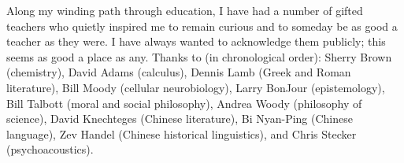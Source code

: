 Along my winding path through education, I have had a number of gifted teachers who quietly inspired me to remain curious and to someday be as good a teacher as they were.  I have always wanted to acknowledge them publicly; this seems as good a place as any.  Thanks to (in chronological order): Sherry Brown (chemistry), David Adams (calculus), Dennis Lamb (Greek and Roman literature), Bill Moody (cellular neurobiology), Larry BonJour (epistemology), Bill Talbott (moral and social philosophy), Andrea Woody (philosophy of science), David Knechteges (Chinese literature), Bi Nyan-Ping (Chinese language), Zev Handel (Chinese historical linguistics), and Chris Stecker (psychoacoustics).
